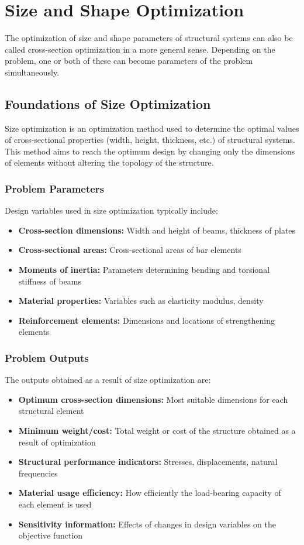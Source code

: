 \section{Size and Shape Optimization}
The optimization of size and shape parameters of structural systems can also be called cross-section optimization in a more general sense. Depending on the problem, one or both of these can become parameters of the problem simultaneously.

\subsection{Foundations of Size Optimization}
Size optimization is an optimization method used to determine the optimal values of cross-sectional properties (width, height, thickness, etc.) of structural systems. This method aims to reach the optimum design by changing only the dimensions of elements without altering the topology of the structure.

\subsubsection{Problem Parameters}
Design variables used in size optimization typically include:
\begin{itemize}
    \item \textbf{Cross-section dimensions:} Width and height of beams, thickness of plates
    \item \textbf{Cross-sectional areas:} Cross-sectional areas of bar elements
    \item \textbf{Moments of inertia:} Parameters determining bending and torsional stiffness of beams
    \item \textbf{Material properties:} Variables such as elasticity modulus, density
    \item \textbf{Reinforcement elements:} Dimensions and locations of strengthening elements
\end{itemize}

\subsubsection{Problem Outputs}
The outputs obtained as a result of size optimization are:
\begin{itemize}
    \item \textbf{Optimum cross-section dimensions:} Most suitable dimensions for each structural element
    \item \textbf{Minimum weight/cost:} Total weight or cost of the structure obtained as a result of optimization
    \item \textbf{Structural performance indicators:} Stresses, displacements, natural frequencies
    \item \textbf{Material usage efficiency:} How efficiently the load-bearing capacity of each element is used
    \item \textbf{Sensitivity information:} Effects of changes in design variables on the objective function
\end{itemize}

